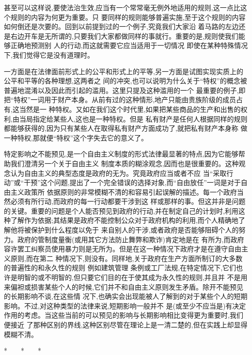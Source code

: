 ﻿\documentclass[12pt]{article}
\begin{document}
甚至可以这样说,要使法治生效,应当有一个常常毫无例外地适用的规则,这一点比这个规则的内容为何更为重要。只
要同样的规则能够普遍实施,至于这个规则的内容如何倒还是次要的。回到以前提到过的一个例子,究竟我们大家沿
着马路的左边还是右边开车是无所谓的,只要我们大家都做同样的事就行。重要的是,规则使我们能够正确地预测别
人的行动,而这就需要它应当适用于一切情况 \myrule 即使在某种特殊情况下,我们觉得它是没有道理时。

一方面是在法律面前形式上的公平和形式上的平等,另一方面是试图实现实质上的公平和平等的各种理想,这两者之
间的冲突,也可以说明为什么关于``特权''的概念被普遍地混淆以及因此而引起的滥用。这里只提及这种滥用的一个
最重要的例子,即把``特权''一词用于财产本身。从前有过的这种情形,地产只能由贵族阶级的成员占有,这当然是一
种特权。又如在我们这个时代里,如果把某些商品的生产和出售的权利,由当局指定给某些人,这也是一种特权。但是
私有财产是任何人根据同样的规则都能够获得的,因为只有某些人在取得私有财产方面成功了,就把私有财产本身称
做一种特权,那就便``特权''这个字失去它的意义了。

特定影响之不能预见,是一个自由主义制度的形式法律最显著的特点,因为它能够帮助我们澄清另一个关于自由主义
制度本质的糊涂观念,因而也是很重要的。这种观念认为自由主义的典型态度是政府的无为。究竟政府应当或者不应
当``采取行动''或``干预''这个问题,提出了一个完全错误的选择对象,而``自由放任''一词是对于自由主义政策所
依据原则的非常模糊不清的和容易引起误解的描述。每一个政府当然必须有所行动,而政府的每一行动都要干涉到这
样或那样的事。但这并非是问题的关键。重要的问题是个人能否预见到政府的行动,并在制定自己的计划时,利用这
种了解作为依据;其结果是政府不能控制公众对于政府机构的利用,而个人精确地了解他将被保护到什么程度以免于
来自别人的干涉,或者政府是否能够阻碍个人的努力。政府的管制度量衡(或用其它方法防止舞弊和欺诈)肯定地是在
有所为,而政府容许罢工纠察员使用暴力则是无所为。但是在这一种情况下政府才是在遵守自由主义原则,而在第二
种情况下,则没有。同样地,关于政府在生产方面所制订的大多数的普遍性的和永久性的规则 \myrule 例如建筑管理
条例或工厂法规,在特定情况下,它们也许是明智的或不明智的,但只要它们目的在于使其成为永久性的规则,并且并
不是用来偏袒或损害某些个人的时候,它们并不和自由主义原则发生矛盾。除开不能预见的长期影响不谈,在这些情
况下,也确实会出现能被人了解到的对于某些个人的短期影响。不过,对这种类型的法律来说,短期影响一般并不
是(或至少不应当是)有决定作用的考虑。当这些当前的可以预见的影响与长期影响相比变得更为重要时,我们便接近
了那种区别的界线,这种区别尽管在理论上是一清二楚的,但在实践上却显得模糊不清。

*　　*　　*
\end{document}
